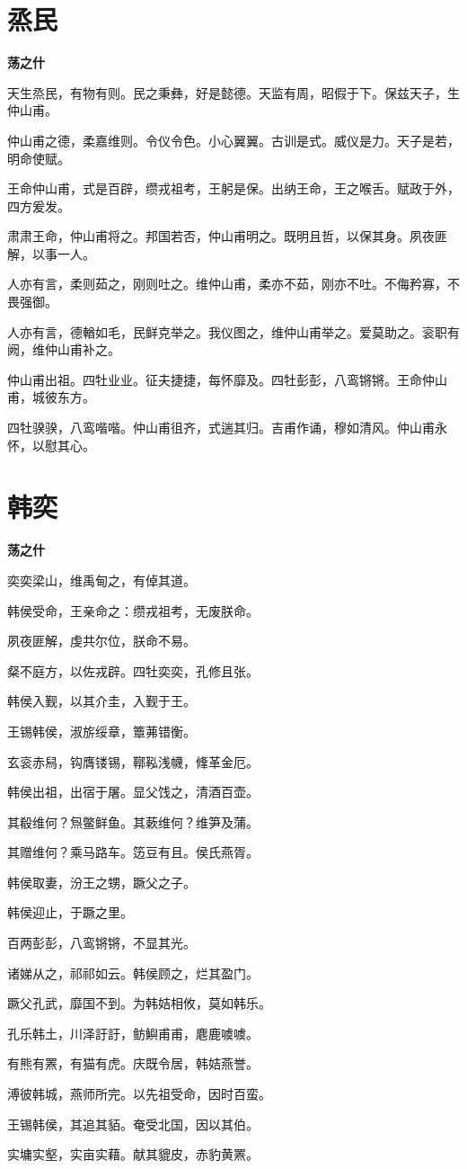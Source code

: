 \documentclass[12pt,a4paper]{ctexbook}
\begin{document}
\section{烝民}
\textbf{荡之什}\par\vspace{0.5em}
天生烝民，有物有则。民之秉彝，好是懿德。天监有周，昭假于下。保兹天子，生仲山甫。\par
仲山甫之德，柔嘉维则。令仪令色。小心翼翼。古训是式。威仪是力。天子是若，明命使赋。\par
王命仲山甫，式是百辟，缵戎祖考，王躬是保。出纳王命，王之喉舌。赋政于外，四方爰发。\par
肃肃王命，仲山甫将之。邦国若否，仲山甫明之。既明且哲，以保其身。夙夜匪解，以事一人。\par
人亦有言，柔则茹之，刚则吐之。维仲山甫，柔亦不茹，刚亦不吐。不侮矜寡，不畏强御。\par
人亦有言，德輶如毛，民鲜克举之。我仪图之，维仲山甫举之。爱莫助之。衮职有阙，维仲山甫补之。\par
仲山甫出祖。四牡业业。征夫捷捷，每怀靡及。四牡彭彭，八鸾锵锵。王命仲山甫，城彼东方。\par
四牡骙骙，八鸾喈喈。仲山甫徂齐，式遄其归。吉甫作诵，穆如清风。仲山甫永怀，以慰其心。\par

\section{韩奕}
\textbf{荡之什}\par\vspace{0.5em}
奕奕梁山，维禹甸之，有倬其道。\par
韩侯受命，王亲命之：缵戎祖考，无废朕命。\par
夙夜匪解，虔共尔位，朕命不易。\par
粲不庭方，以佐戎辟。四牡奕奕，孔修且张。\par
韩侯入觐，以其介圭，入觐于王。\par
王锡韩侯，淑旂绥章，簟茀错衡。\par
玄衮赤舄，钩膺镂锡，鞹鞃浅幭，鞗革金厄。\par
韩侯出祖，出宿于屠。显父饯之，清酒百壶。\par
其殽维何？炰鳖鲜鱼。其蔌维何？维笋及蒲。\par
其赠维何？乘马路车。笾豆有且。侯氏燕胥。\par
韩侯取妻，汾王之甥，蹶父之子。\par
韩侯迎止，于蹶之里。\par
百两彭彭，八鸾锵锵，不显其光。\par
诸娣从之，祁祁如云。韩侯顾之，烂其盈门。\par
蹶父孔武，靡国不到。为韩姞相攸，莫如韩乐。\par
孔乐韩土，川泽訏訏，鲂鱮甫甫，麀鹿噳噳。\par
有熊有罴，有猫有虎。庆既令居，韩姞燕誉。\par
溥彼韩城，燕师所完。以先祖受命，因时百蛮。\par
王锡韩侯，其追其貊。奄受北国，因以其伯。\par
实墉实壑，实亩实藉。献其貔皮，赤豹黄罴。\par
\end{document}
